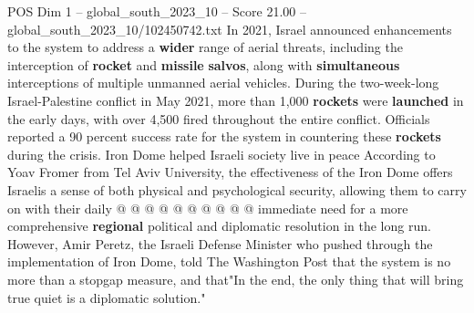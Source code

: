 \begin{textsample}{POS Dim 1 – global\_south\_2023\_10 – Score 21.00 – global\_south\_2023\_10/102450742.txt}
In 2021, Israel announced enhancements to the system to address a \textbf{wider} range of aerial threats, including the interception of \textbf{rocket} and \textbf{missile} \textbf{salvos}, along with \textbf{simultaneous} interceptions of multiple unmanned aerial vehicles.
During the two-week-long Israel-Palestine conflict in May 2021, more than 1,000 \textbf{rockets} were \textbf{launched} in the early days, with over 4,500 fired throughout the entire conflict.
Officials reported a 90 percent success rate for the system in countering these \textbf{rockets} during the crisis.
Iron Dome helped Israeli society live in peace According to Yoav Fromer from Tel Aviv University, the effectiveness of the Iron Dome offers Israelis a sense of both physical and psychological security, allowing them to carry on with their daily @ @ @ @ @ @ @ @ @ @ immediate need for a more comprehensive \textbf{regional} political and diplomatic resolution in the long run.
However, Amir Peretz, the Israeli Defense Minister who pushed through the implementation of Iron Dome, told The Washington Post that the system is no more than a stopgap measure, and that"In the end, the only thing that will bring true quiet is a diplomatic solution."

\end{textsample}
